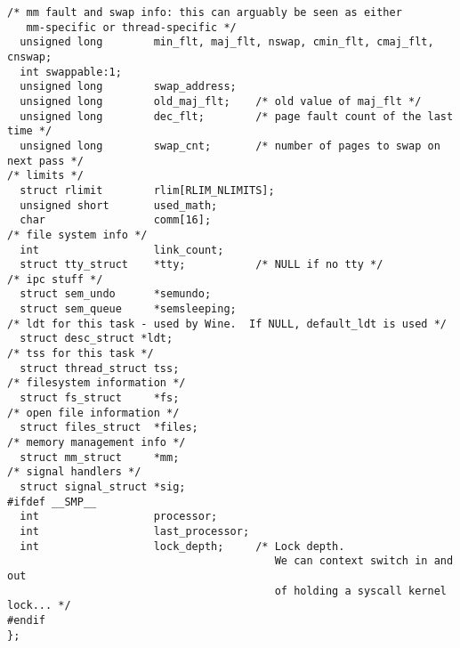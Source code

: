 \begin{lstlisting}
/* mm fault and swap info: this can arguably be seen as either
   mm-specific or thread-specific */
  unsigned long        min_flt, maj_flt, nswap, cmin_flt, cmaj_flt, cnswap;
  int swappable:1;
  unsigned long        swap_address;
  unsigned long        old_maj_flt;    /* old value of maj_flt */
  unsigned long        dec_flt;        /* page fault count of the last time */
  unsigned long        swap_cnt;       /* number of pages to swap on next pass */
/* limits */
  struct rlimit        rlim[RLIM_NLIMITS];
  unsigned short       used_math;
  char                 comm[16];
/* file system info */
  int                  link_count;
  struct tty_struct    *tty;           /* NULL if no tty */
/* ipc stuff */
  struct sem_undo      *semundo;
  struct sem_queue     *semsleeping;
/* ldt for this task - used by Wine.  If NULL, default_ldt is used */
  struct desc_struct *ldt;
/* tss for this task */
  struct thread_struct tss;
/* filesystem information */
  struct fs_struct     *fs;
/* open file information */
  struct files_struct  *files;
/* memory management info */
  struct mm_struct     *mm;
/* signal handlers */
  struct signal_struct *sig;
#ifdef __SMP__
  int                  processor;
  int                  last_processor;
  int                  lock_depth;     /* Lock depth.
                                          We can context switch in and out
                                          of holding a syscall kernel lock... */
#endif
};
\end{lstlisting}
\clearpage
